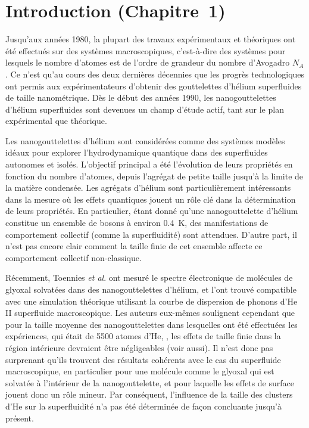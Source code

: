 	\section*{Introduction \small{(Chapitre~1)}}
		Jusqu'aux années 1980, la plupart des travaux expérimentaux et théoriques ont été effectués sur des systèmes macroscopiques, c'est-à-dire des systèmes pour lesquels le nombre d'atomes est de l'ordre de grandeur du nombre d'Avogadro $N_A$. 
		Ce n'est qu'au cours des deux dernières décennies que les progrès technologiques ont permis aux expérimentateurs d'obtenir des gouttelettes d'hélium superfluides de taille nanométrique. 
		Dès le début des années 1990, les nanogouttelettes d'hélium superfluides sont devenues un champ d'étude actif, tant sur le plan expérimental que théorique. 
		
		Les nanogouttelettes d'hélium sont considérées comme des systèmes modèles idéaux pour explorer l'hydrodynamique quantique dans des superfluides autonomes et isolés. 
		L'objectif principal a été l'évolution de leurs propriétés en fonction du nombre d'atomes, depuis l'agrégat de petite taille  jusqu'à la limite de la matière condensée. 
		Les agrégats d'hélium sont particulièrement intéressants dans la mesure où les effets quantiques jouent un rôle clé dans la détermination de leurs propriétés. 
		En particulier, étant donné qu'une nanogouttelette d'hélium constitue un ensemble de bosons à environ 0.4~K\citep{Brink1990, Hartmann1995}, des manifestations de comportement collectif (comme la superfluidité) sont attendues. 
		D'autre part, il n'est pas encore clair comment la taille finie de cet ensemble affecte ce comportement collectif non-classique.

		Récemment, Toennies \emph{et al}. ont mesuré le spectre électronique de molécules de glyoxal solvatées dans des nanogouttelettes d'hélium,\citep{Hartmann1996} et l'ont trouvé compatible avec une simulation théorique utilisant la courbe de dispersion de phonons d'He II superfluide macroscopique. 
		Les auteurs eux-mêmes soulignent cependant que pour la taille moyenne des nanogouttelettes dans lesquelles ont été effectuées les expériences, qui était de 5500 atomes d'He, , les effets de taille finie dans la région intérieure devraient être négligeables (voir aussi). 
		Il n'est donc pas surprenant qu'ils trouvent des résultats cohérents avec le cas du superfluide macroscopique, en particulier pour une molécule comme le glyoxal qui est solvatée à l'intérieur de la nanogouttelette, et pour laquelle les effets de surface jouent donc un rôle mineur. 
		Par conséquent, l'influence de la taille des clusters d'He sur la superfluidité n'a pas été déterminée de façon concluante jusqu'à présent.

